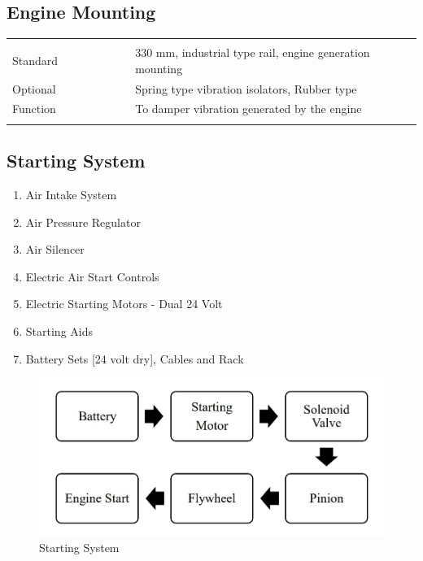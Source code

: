 \documentclass[12pt]{article}
\begin{document}
        \subsection*{Engine Mounting}
        \begin{table}[ht]
          \centering
          \begin{adjustbox}{width=\textwidth}
          \begin{tabularx}{\linewidth}{p{0.3\linewidth} p{0.7\linewidth}}
            \hline 
            \\
            Standard & 330 mm, industrial type rail, engine generation mounting \\
            Optional & Spring type vibration isolators, Rubber type \\
            Function & To damper vibration generated by the engine \\
            \\
            \hline
          \end{tabularx}
          \end{adjustbox}
          \end{table}

        \subsection*{Starting System}
        \begin{multicols}{2}
          \begin{center}
            
            \begin{enumerate}
              \item Air Intake System 
              \item Air Pressure Regulator 
              \item Air Silencer 
              \item Electric Air Start Controls 
              \item Electric Starting Motors - Dual 24 Volt 
              \item Starting Aids 
              \item Battery Sets [24 volt dry], Cables and Rack  
            \end{enumerate}
          \end{center}
          \end{multicols}

          \begin{figure}[H]
            \begin{center}
              \includegraphics[width=0.7\linewidth]{img/starting_system.jpeg}
              \caption{Starting System}
            \end{center}
          \end{figure}
\end{document}
